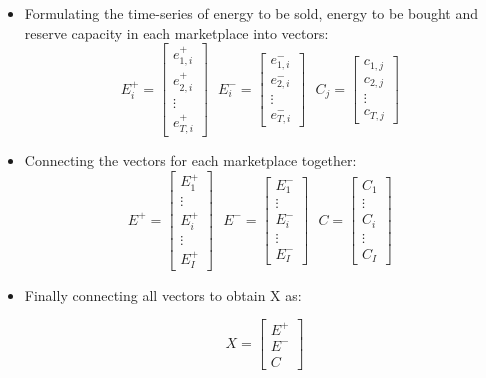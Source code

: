 \begin{itemize}
	\item Formulating the time-series of energy to be sold, energy to be bought and reserve capacity in each marketplace into vectors:
	\begin{equation}
	\label{eq:Ei-Ei-Cj}
	E^+_{i} = 
	\begin{bmatrix}
	e^+_{1,i}\\e^+_{2,i}\\\vdots\\e^+_{T,i}
	\end{bmatrix} ~~~
	E^-_{i} = 
	\begin{bmatrix}
	e^-_{1,i}\\e^-_{2,i}\\\vdots\\e^-_{T,i}
	\end{bmatrix} ~~~
	C_{j} = 
	\begin{bmatrix}
	c_{1,j}\\c_{2,j}\\\vdots\\c_{T,j}
	\end{bmatrix} ~~~
	\end{equation}
	
	\item Connecting the vectors for each marketplace together:
	\begin{equation}
	E^+ = 
	\begin{bmatrix}
	E^+_{1}\\ \vdots \\ E^+_{i}\\ \vdots\\E^+_{I}
	\end{bmatrix} ~~~
	E^- = 
	\begin{bmatrix}
	E^-_{1}\\ \vdots \\ E^-_{i}\\ \vdots\\E^-_{I}
	\end{bmatrix} ~~~
	C = 
	\begin{bmatrix}
	C_{1}\\ \vdots \\ C_{i}\\ \vdots\\C_{I}
	\end{bmatrix} ~~~
	\end{equation}
	
	\item Finally connecting all vectors to obtain X as:
	
	\begin{equation}
	\label{eq:decision-variable-1}
	X =
	\begin{bmatrix}
	E^+ \\ E^- \\ C
	\end{bmatrix}
	\end{equation}
\end{itemize}


